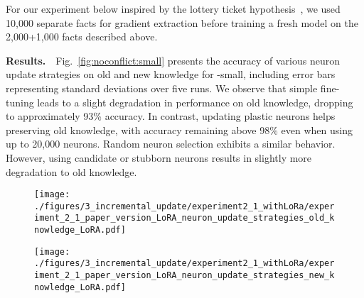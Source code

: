 For our experiment below inspired by the lottery ticket hypothesis~\citep{frankle2018lottery}, we used 10,000 separate facts for gradient extraction before training a fresh model on the 2,000+1,000 facts described above.

\textbf{Results.}\ \  Fig.~\ref{fig:noconflict:small} presents the accuracy of various neuron update strategies on old and new knowledge for \gpttwo-small, including error bars representing standard deviations over five runs. We observe that simple fine-tuning leads to a  slight degradation in performance on old knowledge, dropping to approximately 93\% accuracy. In contrast, updating plastic neurons helps preserving old knowledge, with accuracy remaining above 98\% even when using up to 20,000 neurons. Random neuron selection exhibits a similar behavior. However, using candidate or stubborn neurons results in slightly more degradation to old knowledge. 

\begin{figure*}
    \centering
    \begin{subfigure}[b]{0.45\textwidth}
        \centering
        \texttt{[image: ./figures/3\_incremental\_update/experiment2\_1\_withLoRa/experiment\_2\_1\_paper\_version\_LoRA\_neuron\_update\_strategies\_old\_knowledge\_LoRA.pdf]}
        \label{fig:old:noconflict:small}
    \end{subfigure}
    \begin{subfigure}[b]{0.45\textwidth}
        \centering
        \texttt{[image: ./figures/3\_incremental\_update/experiment2\_1\_withLoRa/experiment\_2\_1\_paper\_version\_LoRA\_neuron\_update\_strategies\_new\_knowledge\_LoRA.pdf]}
        \label{fig:new:noconflict:small}
    \end{subfigure}
    \caption{\textit{Non-dissonant updates}: Old vs new knowledge for targeted updates on \gpttwo-small (see Fig.~\ref{fig:gpt2xl:full:non-conflict} and \ref{fig:pareto_mosaic_combined} for \gpttwo-XL)}\label{fig:noconflict:small}    %
\end{figure*}

